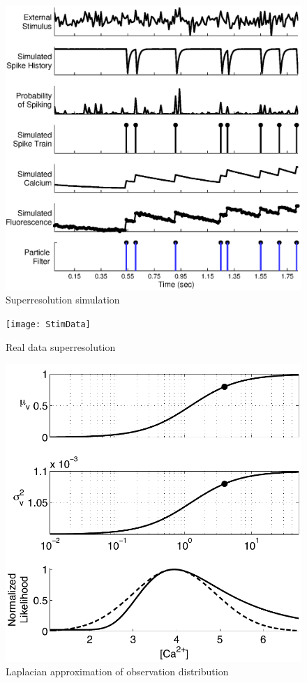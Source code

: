 \documentclass[12pt]{article}
\begin{document}
\clearpage \newpage
\begin{figure}
\begin{centering}
\includegraphics[width=1\linewidth]{StimSim}
\end{centering}
\caption{Superresolution simulation} \label{fig:StimSim}
\end{figure}

\clearpage \newpage
\begin{figure}
\texttt{[image: StimData]}
\caption{Real data superresolution} \label{fig:real}
\end{figure}

\clearpage \newpage
\begin{figure}
\includegraphics[width=\linewidth]{ca_nonlin}
\caption{Laplacian approximation of observation distribution} \label{fig:ca_nonlin}
\end{figure}
\end{document}
